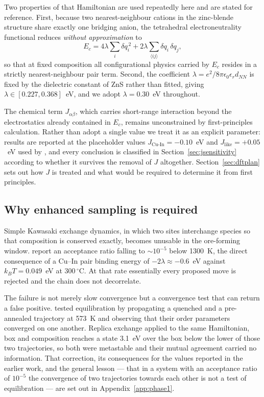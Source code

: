 \documentclass[11pt,a4paper]{article}
\newcommand{\JCuIn}{J_{\mathrm{Cu\text{-}In}}}
\newcommand{\Jlike}{J_{\mathrm{like}}}
\begin{document}
Two properties of that Hamiltonian are used repeatedly here and are stated for
reference. First, because two nearest-neighbour cations in the zinc-blende
structure share exactly one bridging anion, the tetrahedral electroneutrality
functional reduces \emph{without approximation} to
\begin{equation}
E_c = 4\lambda \sum_i \delta q_i^{\,2}
    + 2\lambda \sum_{\langle ij \rangle} \delta q_i\, \delta q_j,
\label{eq:Ecpair}
\end{equation}
so that at fixed composition all configurational physics carried by $E_c$
resides in a strictly nearest-neighbour pair term. Second, the coefficient
$\lambda = e^2/8\pi\epsilon_0\epsilon_r d_{NN}$ is fixed by the dielectric
constant of ZnS rather than fitted, giving
$\lambda \in [0.227, 0.368]$~eV, and we adopt $\lambda = 0.30$~eV throughout.

The chemical term $J_{\alpha\beta}$, which carries short-range interaction
beyond the electrostatics already contained in $E_c$, remains unconstrained by
first-principles calculation. Rather than adopt a single value we treat it as an
explicit parameter: results are reported at the placeholder values
$\JCuIn = -0.10$~eV and $\Jlike = +0.05$~eV used by \citet{yu2026}, and every
conclusion is classified in Section~\ref{sec:jsensitivity} according to whether
it survives the removal of $J$ altogether. Section~\ref{sec:dftplan} sets out
how $J$ is treated and what would be required to determine it from first
principles.

\subsection{Why enhanced sampling is required}
\label{sec:whyrex}

Simple Kawasaki exchange dynamics, in which two sites interchange species so
that composition is conserved exactly, becomes unusable in the ore-forming
window. \citet{yu2026} report an acceptance ratio falling to $\sim10^{-5}$ below
1300~K, the direct consequence of a Cu--In pair binding energy of
$-2\lambda \approx -0.6$~eV against $k_BT = 0.049$~eV at $300\,^\circ$C. At that
rate essentially every proposed move is rejected and the chain does not
decorrelate.

The failure is not merely slow convergence but a convergence test that can
return a false positive. \citet{yu2026} tested equilibration by propagating a
quenched and a pre-annealed trajectory at 573~K and observing that their order
parameters converged on one another. Replica exchange applied to the same
Hamiltonian, box and composition reaches a state 3.1~eV over the box below the
lower of those two trajectories, so both were metastable and their mutual
agreement carried no information. That correction, its consequences for the
values reported in the earlier work, and the general lesson --- that in a system
with an acceptance ratio of $10^{-5}$ the convergence of two trajectories
towards each other is not a test of equilibration --- are set out in
Appendix~\ref{app:phase1}.
\end{document}
